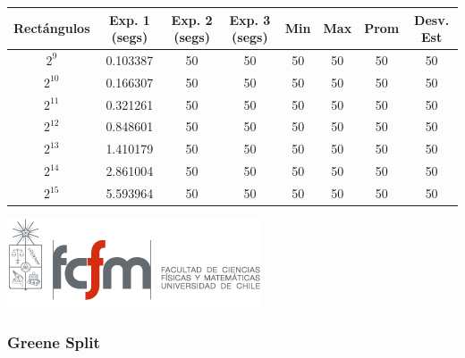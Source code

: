 \documentclass[letterpaper,10pt]{article}
\begin{document}
	\begin{center}

		\begin{tabular}{|c|c|c|c|c|c|c|c|}
			\hline
			Rectángulos	& Exp. 1 (segs) & Exp. 2 (segs) & Exp. 3 (segs) & Min & Max & Prom & Desv. Est\\
			\hline
			$2^{9}$ 	& 0.103387 & 50 	& 50 	& 50 	& 50 	& 50 	& 50 \\
			\hline
			$2^{10}$ 	& 0.166307 & 50 	& 50 	& 50 	& 50 	& 50 	& 50 \\
			\hline
			$2^{11}$ 	& 0.321261 & 50 	& 50 	& 50 	& 50 	& 50 	& 50 \\
			\hline
			$2^{12}$ 	& 0.848601 & 50 	& 50 	& 50 	& 50 	& 50 	& 50 \\
			\hline
			$2^{13}$ 	& 1.410179 & 50 	& 50 	& 50 	& 50 	& 50 	& 50 \\
			\hline
			$2^{14}$ 	& 2.861004 & 50 	& 50 	& 50 	& 50 	& 50 	& 50 \\
			\hline
			$2^{15}$ 	& 5.593964 & 50 	& 50 	& 50 	& 50 	& 50 	& 50 \\
			\hline
		\end{tabular}

		\includegraphics{logoFCFM.png}
	\end{center}

	\subsubsection{Greene Split}
\end{document}
